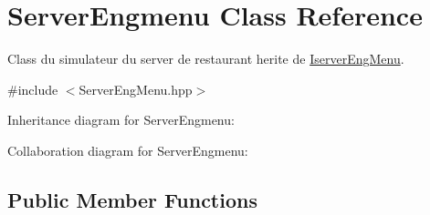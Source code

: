 \hypertarget{classServerEngmenu}{}\section{Server\+Engmenu Class Reference}
\label{classServerEngmenu}


Class du simulateur du server de restaurant herite de \hyperlink{classIserverEngMenu}{Iserver\+Eng\+Menu}.  




{\ttfamily \#include $<$Server\+Eng\+Menu.\+hpp$>$}



Inheritance diagram for Server\+Engmenu\+:


Collaboration diagram for Server\+Engmenu\+:
\subsection*{Public Member Functions}
